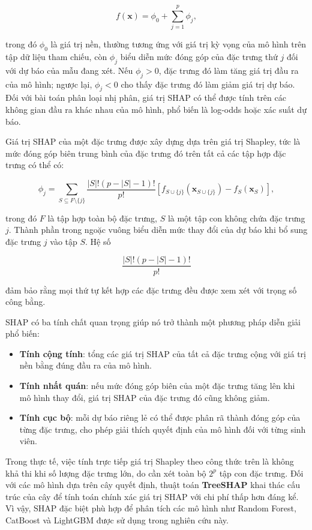 \documentclass[a4paper]{report}
\begin{document}
\[
  f(\mathbf{x}) = \phi_0 + \sum_{j=1}^{p}\phi_j,
\]

trong đó $\phi_0$ là giá trị nền, thường tương ứng với giá trị kỳ vọng của mô
hình trên tập dữ liệu tham chiếu, còn $\phi_j$ biểu diễn mức đóng góp của đặc
trưng thứ $j$ đối với dự báo của mẫu đang xét. Nếu
$\phi_j > 0$, đặc trưng đó làm tăng giá trị đầu ra của mô hình; ngược lại,
$\phi_j < 0$ cho thấy đặc trưng đó làm giảm giá trị dự báo. Đối với bài toán
phân loại nhị phân, giá trị SHAP có thể được tính trên các không gian đầu ra
khác nhau của mô hình, phổ biến là log-odds hoặc xác suất dự báo.

Giá trị SHAP của một đặc trưng được xây dựng dựa trên giá trị Shapley, tức là
mức đóng góp biên trung bình của đặc trưng đó trên tất cả các tập hợp đặc trưng
có thể có:

\[
  \phi_j
  =
  \sum_{S \subseteq F \setminus \{j\}}
  \frac{|S|!(p-|S|-1)!}{p!}
  \left[
    f_{S\cup\{j\}}(\mathbf{x}_{S\cup\{j\}})
    -
    f_S(\mathbf{x}_S)
  \right],
\]

trong đó $F$ là tập hợp toàn bộ đặc trưng, $S$ là một tập con không chứa đặc
trưng $j$. Thành phần trong ngoặc vuông biểu diễn mức thay đổi của dự báo khi
bổ sung đặc trưng $j$ vào tập $S$. Hệ số

\[
\frac{|S|!(p-|S|-1)!}{p!}
\]

đảm bảo rằng mọi thứ tự kết hợp các đặc trưng đều được xem xét với trọng số
công bằng.

SHAP có ba tính chất quan trọng giúp nó trở thành một phương pháp diễn giải
phổ biến:

\begin{itemize}[leftmargin=*]
  \item \textbf{Tính cộng tính}: tổng các giá trị SHAP của tất cả đặc trưng
        cộng với giá trị nền bằng đúng đầu ra của mô hình.
  \item \textbf{Tính nhất quán}: nếu mức đóng góp biên của một đặc trưng tăng
        lên khi mô hình thay đổi, giá trị SHAP của đặc trưng đó cũng không
        giảm.
  \item \textbf{Tính cục bộ}: mỗi dự báo riêng lẻ có thể được phân rã thành
        đóng góp của từng đặc trưng, cho phép giải thích quyết định của mô hình
        đối với từng sinh viên.
\end{itemize}

Trong thực tế, việc tính trực tiếp giá trị Shapley theo công thức trên là không
khả thi khi số lượng đặc trưng lớn, do cần xét toàn bộ $2^p$ tập con đặc trưng.
Đối với các mô hình dựa trên cây quyết định, thuật toán
\textbf{TreeSHAP} khai thác cấu trúc của cây để tính toán chính xác giá trị SHAP
với chi phí thấp hơn đáng kể. Vì vậy, SHAP đặc biệt phù hợp để phân tích các mô
hình như Random Forest, CatBoost và LightGBM được sử dụng trong nghiên cứu này.
\end{document}
